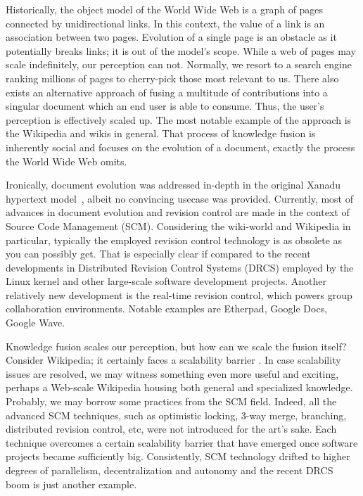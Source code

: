 \documentclass{sig-alternate}
\begin{document}
Historically, the object model of the World Wide Web is a graph of pages connected by unidirectional links.
In this context, the value of a link is an association between two pages.
Evolution of a single page is an obstacle as it potentially breaks links; it is out of the model’s scope.
While a web of pages may scale indefinitely, our perception can not. 
Normally, we resort to a search engine ranking millions of pages to cherry-pick those most relevant to us.
There also exists an alternative approach of fusing a multitude of contributions into a singular document which an end user is able to consume.
Thus, the user's perception is effectively scaled up.
The most notable example of the approach is the Wikipedia and wikis in general.
That process of knowledge fusion is inherently social and focuses on the evolution of a document, exactly the process the World Wide Web omits.

Ironically, document evolution was addressed in-depth in the original Xanadu hypertext model~\cite{literary}, albeit no convincing usecase was provided.
Currently, most of advances in document evolution and revision control are made in the context of Source Code Management (SCM).
Considering the wiki-world and Wikipedia in particular, typically the employed revision control technology is as obsolete as you can possibly get.
That is especially clear if compared to the recent developments in Distributed Revision Control Systems (DRCS) employed by the Linux kernel and other large-scale software development projects.
Another relatively new development is the real-time revision control, which powers group collaboration environments. Notable examples are Etherpad, Google Docs, Google Wave.

Knowledge fusion scales our perception, but how can we scale the fusion itself?
Consider Wikipedia; it certainly faces a scalability barrier \cite{no-singularity, wp-decay}.
In case scalability issues are resolved, we may witness something even more useful and exciting, perhaps a Web-scale Wikipedia housing both general and specialized knowledge.
Probably, we may borrow some practices from the SCM field.
Indeed, all the advanced SCM techniques, such as optimistic locking, 3-way merge, branching, distributed revision control, etc, were not introduced for the art's sake.
Each technique overcomes a certain scalability barrier that have emerged once software projects became sufficiently big.
Consistently, SCM technology drifted to higher degrees of parallelism, decentralization and autonomy and the recent DRCS boom is just another example.
\end{document}
